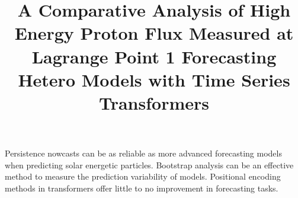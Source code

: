 \documentclass[draft]{figs/agu/agujournal2025}
\begin{document}

\title{A Comparative Analysis of High Energy Proton Flux Measured at Lagrange Point 1 Forecasting Hetero Models  with Time Series Transformers}



\keypoints
{Persistence nowcasts can be as reliable as more advanced forecasting models when predicting solar energetic particles.}
{Bootstrap analysis can be an effective method to measure the prediction variability of models.}
{Positional encoding methods in transformers offer little to no improvement in forecasting tasks.}

\maketitle
\clearpage


\clearpage

\clearpage

\clearpage

\clearpage

\clearpage

\clearpage

\clearpage


\clearpage

\end{document}
